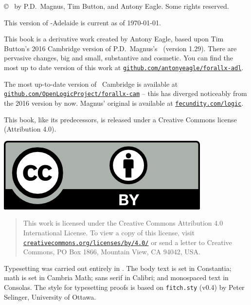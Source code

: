 {\copyright\  by P.D.\ Magnus, Tim Button, and Antony Eagle. Some rights reserved.

This version of \forallx-Adelaide is current as of \today.

\medskip

This book is a derivative work created by Antony Eagle, based upon Tim Button's 2016 Cambridge version of P.D.\ Magnus's \forallx\ (version 1.29). There are pervasive changes, big and small, substantive and cosmetic. You can find the most up to date version of this work at \href{https://github.com/antonyeagle/forallx-adl}{\nolinkurl{github.com/antonyeagle/forallx-adl}}. 

The most up-to-date version of \forallx\ Cambridge is available at \href{https://github.com/OpenLogicProject/forallx-cam}{\nolinkurl{github.com/OpenLogicProject/forallx-cam}} – this has diverged noticeably from the 2016 version by now. Magnus' original is available at \href{http://fecundity.com/logic}{\nolinkurl{fecundity.com/logic}}. 

This book, like its predecessors, is released under a Creative Commons license (Attribution 4.0).\medskip 

\begin{center}
	\includegraphics{cc-by.png} 
\end{center}

\begin{quote}
	{\small This work is licensed under the Creative Commons Attribution 4.0 International License. To view a copy of this license, visit \href{https://creativecommons.org/licenses/by/4.0/}{\nolinkurl{creativecommons.org/licenses/by/4.0/}} or send a letter to Creative Commons, PO Box 1866, Mountain View, CA 94042, USA.} 
\end{quote} \medskip
\vfill

Typesetting was carried out entirely in \XeLaTeX. The body text is set in Constantia; math is set in Cambria Math; sans serif in Calibri; and monospaced text in Consolas. The style for typesetting proofs is based on \texttt{fitch.sty} (v0.4) by Peter Selinger, University of Ottawa.

}

